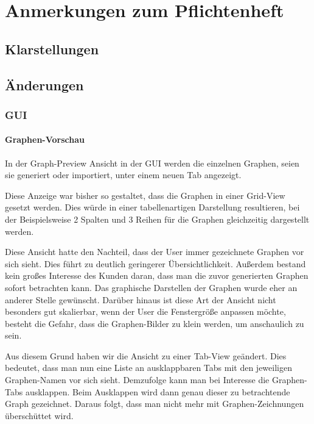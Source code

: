 \section{Anmerkungen zum Pflichtenheft}
	\subsection{Klarstellungen}
	\subsection{Änderungen}	
	\subsubsection{GUI}
			\paragraph{Graphen-Vorschau}
				In der Graph-Preview Ansicht in der GUI werden die einzelnen Graphen, seien sie generiert oder importiert, unter einem neuen Tab angezeigt.
				
				Diese Anzeige war bisher so gestaltet, dass die Graphen in einer Grid-View gesetzt werden.
				Dies würde in einer tabellenartigen Darstellung resultieren, bei der Beispielsweise 2 Spalten und 3 Reihen für die Graphen gleichzeitig dargestellt werden.
				
				Diese Ansicht hatte den Nachteil, dass der User immer gezeichnete Graphen vor sich sieht.
				Dies führt zu deutlich geringerer Übersichtlichkeit.
				Außerdem bestand kein großes Interesse des Kunden daran, dass man die zuvor generierten Graphen sofort betrachten kann.
					Das graphische Darstellen der Graphen wurde eher an anderer Stelle gewünscht.
				Darüber hinaus ist diese Art der Ansicht nicht besonders gut skalierbar, wenn der User die Fenstergröße anpassen möchte, besteht die Gefahr, dass die Graphen-Bilder zu klein werden, um anschaulich zu sein.
				
				Aus diesem Grund haben wir die Ansicht zu einer Tab-View geändert.
				Dies bedeutet, dass man nun eine Liste an ausklappbaren Tabs mit den jeweiligen Graphen-Namen vor sich sieht.
				Demzufolge kann man bei Interesse die Graphen-Tabs ausklappen.
					Beim Ausklappen wird dann genau dieser zu betrachtende Graph gezeichnet.
					Daraus folgt, dass man nicht mehr mit Graphen-Zeichnungen überschüttet wird.
				
